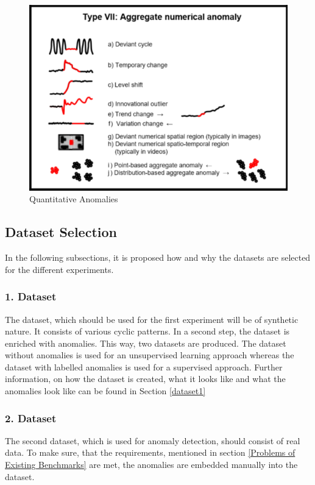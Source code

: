 \begin{figure}[h]
	\centering
	\includegraphics[scale=0.6]{Figures/series_anomaly}
	\decoRule
	\caption[Quantitative Anomalies]{Quantitative Anomalies \parencite{Foorthuis2021}}
	\label{fig:Anomaly_types}
\end{figure}

\subsection{Dataset Selection}
In the following subsections, it is proposed how and why the datasets are selected for the different experiments.

\subsubsection{1. Dataset}
The dataset, which should be used for the first experiment will be of synthetic nature. It consists of various cyclic patterns. In a second step, the dataset is enriched with anomalies. This way, two datasets are produced. The dataset without anomalies is used for an unsupervised learning approach whereas the dataset with labelled anomalies is used for a supervised approach. Further information, on how the dataset is created, what it looks like and what the anomalies look like can be found in Section \ref{dataset1} 

\subsubsection{2. Dataset}
The second dataset, which is used for anomaly detection, should consist of real data. To make sure, that the requirements, mentioned in section \ref{Problems of Existing Benchmarks} are met, the anomalies are embedded manually into the dataset. 

